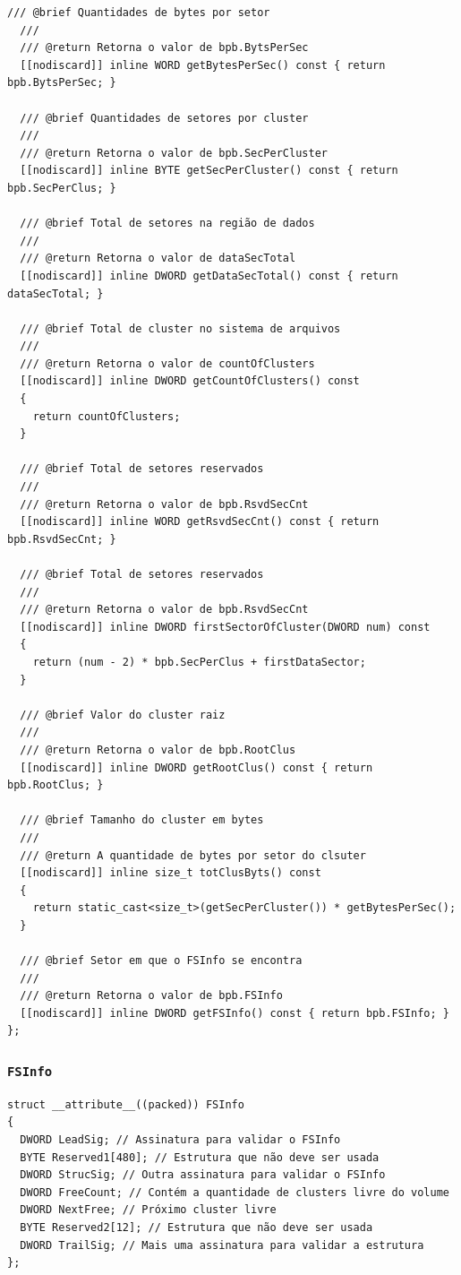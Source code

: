 \documentclass[
    12pt,				%
    oneside,   	        %
    a4paper,			%
    english,			%
    french,				%
    spanish,			%
    brazil,				%
    ]{pacotes/abntex2}
\begin{document}
\begin{lstlisting}[caption={Classe que abstrai a extração de informações da estrutura BPB}, label={lst:biosblock}]
  /// @brief Quantidades de bytes por setor
  ///
  /// @return Retorna o valor de bpb.BytsPerSec
  [[nodiscard]] inline WORD getBytesPerSec() const { return bpb.BytsPerSec; }

  /// @brief Quantidades de setores por cluster
  ///
  /// @return Retorna o valor de bpb.SecPerCluster
  [[nodiscard]] inline BYTE getSecPerCluster() const { return bpb.SecPerClus; }

  /// @brief Total de setores na região de dados
  ///
  /// @return Retorna o valor de dataSecTotal
  [[nodiscard]] inline DWORD getDataSecTotal() const { return dataSecTotal; }

  /// @brief Total de cluster no sistema de arquivos
  ///
  /// @return Retorna o valor de countOfClusters
  [[nodiscard]] inline DWORD getCountOfClusters() const
  {
    return countOfClusters;
  }

  /// @brief Total de setores reservados
  ///
  /// @return Retorna o valor de bpb.RsvdSecCnt
  [[nodiscard]] inline WORD getRsvdSecCnt() const { return bpb.RsvdSecCnt; }

  /// @brief Total de setores reservados
  ///
  /// @return Retorna o valor de bpb.RsvdSecCnt
  [[nodiscard]] inline DWORD firstSectorOfCluster(DWORD num) const
  {
    return (num - 2) * bpb.SecPerClus + firstDataSector;
  }

  /// @brief Valor do cluster raiz
  ///
  /// @return Retorna o valor de bpb.RootClus
  [[nodiscard]] inline DWORD getRootClus() const { return bpb.RootClus; }

  /// @brief Tamanho do cluster em bytes
  ///
  /// @return A quantidade de bytes por setor do clsuter
  [[nodiscard]] inline size_t totClusByts() const
  {
    return static_cast<size_t>(getSecPerCluster()) * getBytesPerSec();
  }

  /// @brief Setor em que o FSInfo se encontra
  ///
  /// @return Retorna o valor de bpb.FSInfo
  [[nodiscard]] inline DWORD getFSInfo() const { return bpb.FSInfo; }
};
\end{lstlisting}

\subsubsection{\texttt{FSInfo}}
\label{subsubsec:fsinfo}

\begin{lstlisting}[caption={Estrutura que representa o FSInfo encontrado no volume FAT}, label={lst:fsinfo}]
struct __attribute__((packed)) FSInfo
{
  DWORD LeadSig; // Assinatura para validar o FSInfo
  BYTE Reserved1[480]; // Estrutura que não deve ser usada
  DWORD StrucSig; // Outra assinatura para validar o FSInfo
  DWORD FreeCount; // Contém a quantidade de clusters livre do volume
  DWORD NextFree; // Próximo cluster livre
  BYTE Reserved2[12]; // Estrutura que não deve ser usada
  DWORD TrailSig; // Mais uma assinatura para validar a estrutura
};
\end{lstlisting}
\end{document}
